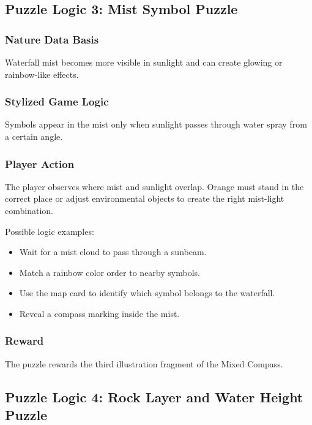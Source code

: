 \documentclass[12pt]{article}
\begin{document}
\subsection{Puzzle Logic 3: Mist Symbol Puzzle}

\subsubsection{Nature Data Basis}

Waterfall mist becomes more visible in sunlight and can create glowing or rainbow-like effects.

\subsubsection{Stylized Game Logic}

Symbols appear in the mist only when sunlight passes through water spray from a certain angle.

\subsubsection{Player Action}

The player observes where mist and sunlight overlap. Orange must stand in the correct place or adjust environmental objects to create the right mist-light combination.

Possible logic examples:

\begin{itemize}[leftmargin=*]
    \item Wait for a mist cloud to pass through a sunbeam.
    \item Match a rainbow color order to nearby symbols.
    \item Use the map card to identify which symbol belongs to the waterfall.
    \item Reveal a compass marking inside the mist.
\end{itemize}

\subsubsection{Reward}

The puzzle rewards the third illustration fragment of the Mixed Compass.

\subsection{Puzzle Logic 4: Rock Layer and Water Height Puzzle}
\end{document}
